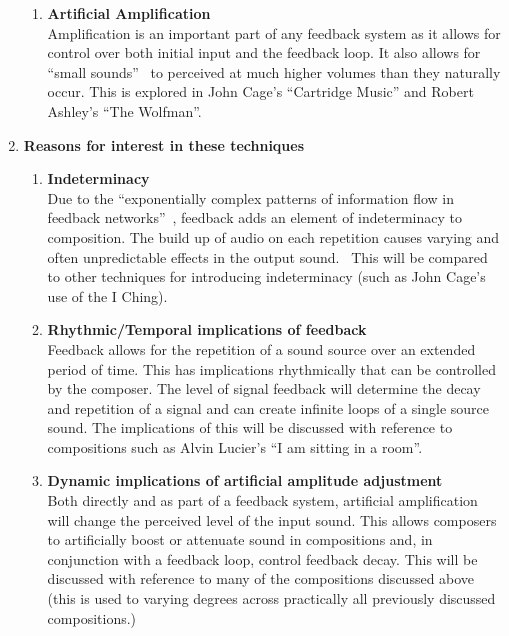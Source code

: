 \documentclass{scrartcl}
\begin{document}
\begin{enumerate}
\begin{enumerate}[label*=\arabic*.]
            \item \textbf{Artificial Amplification}\\
                Amplification is an important part of any feedback system as it
                allows for control over both initial input and the feedback
                loop. It also allows for ``small
                sounds''~\parencite[p.6]{cage2011silence} to perceived at much
                higher volumes than they naturally occur. This is explored in
                John Cage's ``Cartridge Music'' and Robert Ashley's ``The
                Wolfman''.

        \end{enumerate}
    \item \textbf{Reasons for interest in these techniques}
        \begin{enumerate}[label*=\arabic*.]
            \item \textbf{Indeterminacy}\\
                Due to the ``exponentially complex patterns of information flow
                in feedback networks''~\parencite[p.11]{weisert2010ioi},
                feedback adds an element of indeterminacy to composition. The
                build up of audio on each repetition causes varying and often
                unpredictable effects in the output
                sound.~\parencite[p.100]{nyman1999em} This will be compared to
                other techniques for introducing indeterminacy (such as John
                Cage's use of the I Ching).

            \item \textbf{Rhythmic/Temporal implications of feedback}\\
                Feedback allows for the repetition of a sound source over an
                extended period of time. This has implications rhythmically that
                can be controlled by the composer. The level of signal feedback
                will determine the decay and repetition of a signal and can
                create infinite loops of a single source sound. The
                implications of this will be discussed with reference to
                compositions such as Alvin Lucier's ``I am sitting in a
                room''.~\parencite[p.57-59, 64-68]{weisert2010ioi}


            \item \textbf{Dynamic implications of artificial amplitude
                    adjustment}\\
                Both directly and as part of a feedback system, artificial
                amplification will change the perceived level of the input
                sound. This allows composers to artificially boost or attenuate
                sound in compositions and, in conjunction with a feedback loop,
                control feedback decay. This will be discussed with reference
                to many of the compositions discussed above (this is used to
                    varying degrees across practically all previously discussed
                compositions.)



\end{enumerate}
\end{enumerate}
\end{document}
